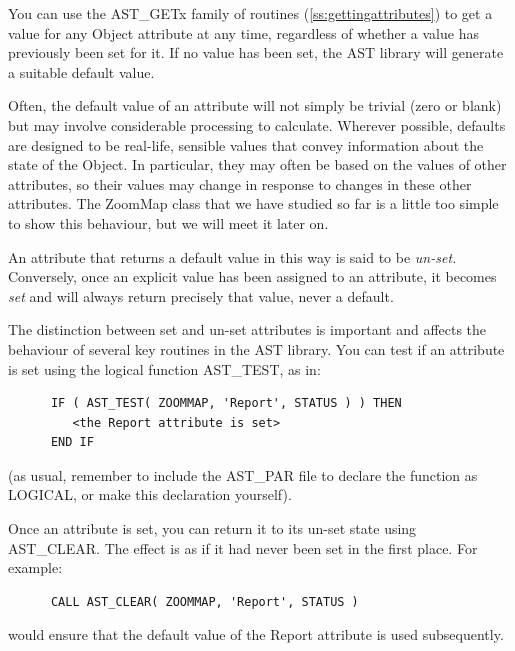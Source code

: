 \documentclass[twoside,11pt]{article}
\newcommand{\htmlref}[2]{#1}
\newcommand{\secref}[1]{\S\ref{#1}}
\renewcommand{\secref}[1]{\ref{#1}}
\begin{document}
You can use the AST\_GETx family of routines
(\secref{ss:gettingattributes}) to get a value for any \htmlref{Object}{Object} attribute
at any time, regardless of whether a value has previously been set for
it. If no value has been set, the AST library will generate a suitable
default value.

Often, the default value of an attribute will not simply be trivial
(zero or blank) but may involve considerable processing to
calculate. Wherever possible, defaults are designed to be real-life,
sensible values that convey information about the state of the
Object. In particular, they may often be based on the values of other
attributes, so their values may change in response to changes in these
other attributes. The \htmlref{ZoomMap}{ZoomMap} class that we have studied so far is a
little too simple to show this behaviour, but we will meet it later
on.

An attribute that returns a default value in this way is said to be
{\em{un-set.}} Conversely, once an explicit value has been assigned to
an attribute, it becomes {\em{set}} and will always return precisely
that value, never a default.

The distinction between set and un-set attributes is important and
affects the behaviour of several key routines in the AST library. You
can test if an attribute is set using the logical function \htmlref{AST\_TEST}{AST_TEST},
as in:

\small
\begin{verbatim}
      IF ( AST_TEST( ZOOMMAP, 'Report', STATUS ) ) THEN
         <the Report attribute is set>
      END IF
\end{verbatim}
\normalsize

(as usual, remember to include the AST\_PAR file to declare the
function as LOGICAL, or make this declaration yourself).

Once an attribute is set, you can return it to its un-set state using
\htmlref{AST\_CLEAR}{AST_CLEAR}. The effect is as if it had never been set in the first
place. For example:

\small
\begin{verbatim}
      CALL AST_CLEAR( ZOOMMAP, 'Report', STATUS )
\end{verbatim}
\normalsize

would ensure that the default value of the \htmlref{Report}{Report} attribute is used
subsequently.

\end{document}
